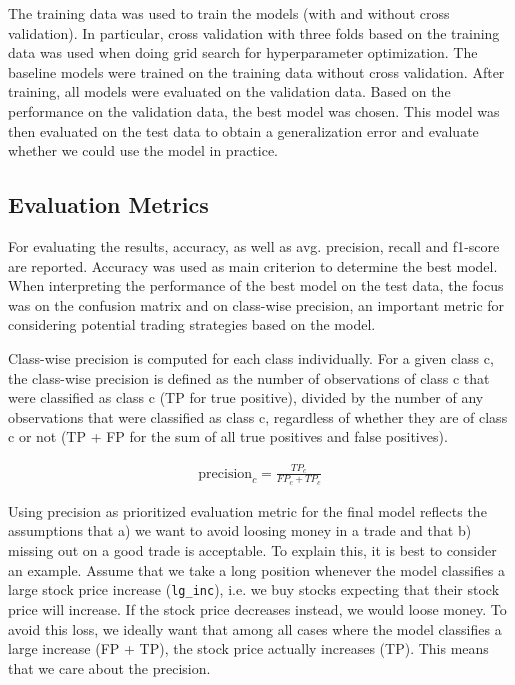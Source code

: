 \documentclass{article}
\begin{document}
	The training data was used to train the models (with and without cross validation). In particular, cross validation with three folds based on the training data was used when doing grid search for hyperparameter optimization. The baseline models were trained on the training data without cross validation. After training, all models were evaluated on the validation data. Based on the performance on the validation data, the best model was chosen. This model was then evaluated on the test data to obtain a generalization error and evaluate whether we could use the model in practice. 
	
	\subsection{Evaluation Metrics}
	
	For evaluating the results, accuracy, as well as avg. precision, recall and f1-score are reported. Accuracy was used as main criterion to determine the best model. When interpreting the performance of the best model on the test data, the focus was on the confusion matrix and on class-wise precision, an important metric for considering potential trading strategies based on the model.
	
	Class-wise precision is computed for each class individually. For a given class c, the class-wise precision is defined as the number of observations of class c that were classified as class c (TP for true positive), divided by the number of any observations that were classified as class c, regardless of whether they are of class c or not (TP + FP for the sum of all true positives and false positives).
	
	\begin{align}
	\mathrm{precision}_c = \frac{TP_c}{FP_c + TP_c}
	\end{align}
	
	Using precision as prioritized evaluation metric for the final model reflects the assumptions that a) we want to avoid loosing money in a trade and that b) missing out on a good trade is acceptable. To explain this, it is best to consider an example. Assume that we take a long position whenever the model classifies a large stock price increase (\verb|lg_inc|), i.e. we buy stocks expecting that their stock price will increase. If the stock price decreases instead, we would loose money. To avoid this loss, we ideally want that among all cases where the model classifies a large increase (FP + TP), the stock price actually increases (TP). This means that we care about the precision. 
	
\end{document}
